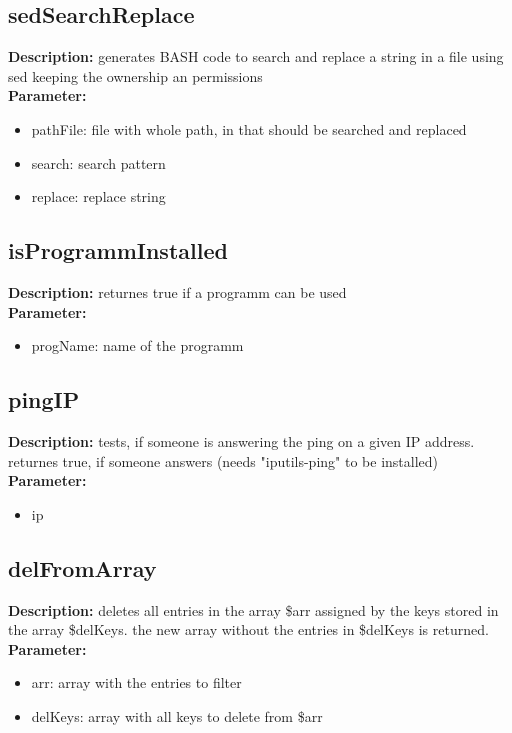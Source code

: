 \subsection{sedSearchReplace}
\textbf{Description:} generates BASH code to search and replace a string in a file using sed keeping the ownership an permissions\\
\textbf{Parameter:}
\begin{itemize}
\item pathFile: file with whole path, in that should be searched and replaced
\item search: search pattern
\item replace: replace string
\end{itemize}

\subsection{isProgrammInstalled}
\textbf{Description:} returnes true if a programm can be used\\
\textbf{Parameter:}
\begin{itemize}
\item progName: name of the programm
\end{itemize}

\subsection{pingIP}
\textbf{Description:} tests, if someone is answering the ping on a given IP address. returnes true, if someone answers (needs "iputils-ping" to be installed)\\
\textbf{Parameter:}
\begin{itemize}
\item ip
\end{itemize}

\subsection{delFromArray}
\textbf{Description:} deletes all entries in the array \$arr assigned by the keys stored in the array \$delKeys. the new array without the entries in \$delKeys is returned.\\
\textbf{Parameter:}
\begin{itemize}
\item arr: array with the entries to filter
\item delKeys: array with all keys to delete from \$arr
\end{itemize}

